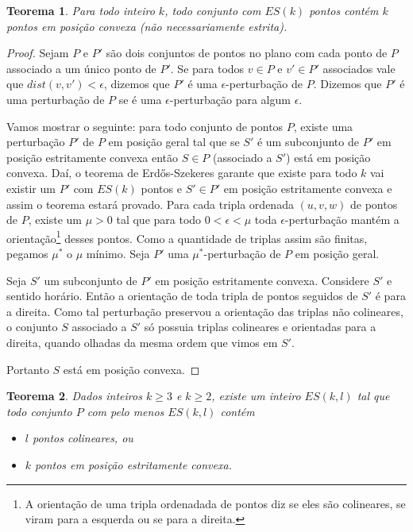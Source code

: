 \documentclass[a4paper]{book}
\newtheorem{teorema}{Teorema}
\begin{document}
\begin{teorema}\label{EScolinear}
    Para todo inteiro $k$, todo conjunto com $ES(k)$ pontos contém $k$ pontos em posição convexa (não necessariamente estrita).
\end{teorema}
\begin{proof}
    Sejam $P$ e $P'$ são dois conjuntos de pontos no plano com cada ponto de $P$ associado a um único ponto de $P'$. Se para todos $v\in P$ e $v'\in P'$ associados vale que $dist(v,v')<\epsilon$, dizemos que $P'$ é uma $\epsilon$-perturbação de $P$. Dizemos que $P'$ é uma perturbação de $P$ se é uma $\epsilon$-perturbação para algum $\epsilon$.
    
    Vamos mostrar o seguinte: para todo conjunto de pontos $P$, existe uma perturbação $P'$ de $P$ em posição geral tal que se $S'$ é um subconjunto de $P'$ em posição estritamente convexa então $S\in P$ (associado a $S'$) está em posição convexa.
    Daí, o teorema de Erd\H os-Szekeres garante que existe para todo $k$ vai existir um $P'$ com $ES(k)$ pontos e $S'\in P'$ em posição estritamente convexa e assim o teorema estará provado.
    Para cada tripla ordenada $(u,v,w)$ de pontos de $P$, existe um $\mu>0$ tal que para todo $0<\epsilon<\mu$ toda $\epsilon$-perturbação mantém a orientação\footnote{A orientação de uma tripla ordenadada de pontos diz se eles são colineares, se viram para a esquerda ou se para a direita.} desses pontos. Como a quantidade de triplas assim são finitas, pegamos $\mu^*$ o $\mu$ mínimo. Seja $P'$ uma $\mu^*$-perturbação de $P$ em posição geral.
    
    Seja $S'$ um subconjunto de $P'$ em posição estritamente convexa. Considere $S'$ e sentido horário. Então a orientação de toda tripla de pontos seguidos de $S'$ é para a direita. Como tal perturbação preservou a orientação das triplas não colineares, o conjunto $S$ associado a $S'$ só possuia triplas colineares e orientadas para a direita, quando olhadas da mesma ordem que vimos em $S'$.

    Portanto $S$ está em posição convexa.
\end{proof}
\begin{teorema}
    Dados inteiros $k\geq 3$ e $k\geq 2$, existe um inteiro $ES(k,l)$ tal que todo conjunto $P$ com pelo menos $ES(k,l)$ contém 
    \begin{itemize}
        \item $l$ pontos colineares, ou
        \item $k$ pontos em posição estritamente convexa.
    \end{itemize}
\end{teorema}
\end{document}
